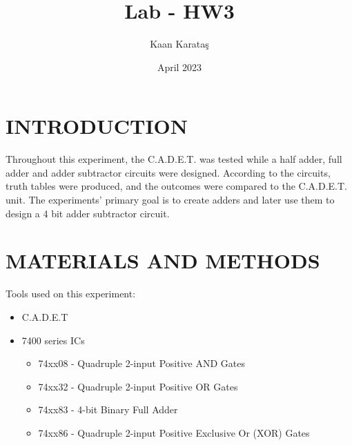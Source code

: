 \documentclass[pdftex,12pt,a4paper]{article}
\title{Lab - HW3}
\author{Kaan Karataş}
\date{April 2023}
\theoremstyle{plain}
\begin{document}


\thispagestyle{empty}


\setcounter{tocdepth}{4}
\tableofcontents
\clearpage
\setcounter{page}{1}
\setcounter{subsubsection}{0}

\section{INTRODUCTION}
Throughout this experiment, the C.A.D.E.T. was tested while a half adder, full adder and adder subtractor circuits were designed. According to the circuits, truth tables were produced, and the outcomes were compared to the C.A.D.E.T. unit. The experiments’ primary goal is to create adders and later use them to design a 4 bit adder subtractor circuit.

\section{MATERIALS AND METHODS}
Tools used on this experiment:
\begin{itemize}
    \item C.A.D.E.T
    \item 7400 series ICs
    \begin{itemize}
        \item 74xx08 - Quadruple 2-input Positive AND Gates
        \item 74xx32 - Quadruple 2-input Positive OR Gates
        \item 74xx83 - 4-bit Binary Full Adder
        \item 74xx86 - Quadruple 2-input Positive Exclusive Or (XOR) Gates
    \end{itemize}
\end{itemize}
\newpage
\end{document}
